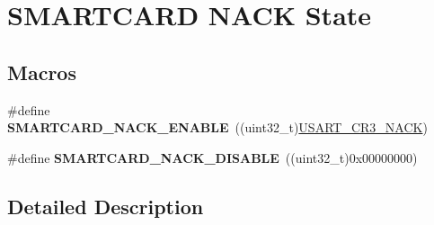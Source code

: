 \hypertarget{group___smart_card___n_a_c_k___state}{}\section{S\+M\+A\+R\+T\+C\+A\+RD N\+A\+CK State}
\label{group___smart_card___n_a_c_k___state}
\subsection*{Macros}
\begin{DoxyCompactItemize}
\item 
\#define {\bfseries S\+M\+A\+R\+T\+C\+A\+R\+D\+\_\+\+N\+A\+C\+K\+\_\+\+E\+N\+A\+B\+LE}~((uint32\+\_\+t)\hyperlink{group___peripheral___registers___bits___definition_ga3f3b70b2ee9ff0b59e952fd7ab04373c}{U\+S\+A\+R\+T\+\_\+\+C\+R3\+\_\+\+N\+A\+CK})\hypertarget{group___smart_card___n_a_c_k___state_ga83d350ff558fc372bc2efc5b5a477147}{}\label{group___smart_card___n_a_c_k___state_ga83d350ff558fc372bc2efc5b5a477147}

\item 
\#define {\bfseries S\+M\+A\+R\+T\+C\+A\+R\+D\+\_\+\+N\+A\+C\+K\+\_\+\+D\+I\+S\+A\+B\+LE}~((uint32\+\_\+t)0x00000000)\hypertarget{group___smart_card___n_a_c_k___state_ga746a79736cf7c2f8478b6c00f7908eda}{}\label{group___smart_card___n_a_c_k___state_ga746a79736cf7c2f8478b6c00f7908eda}

\end{DoxyCompactItemize}


\subsection{Detailed Description}
